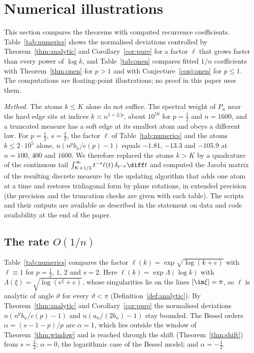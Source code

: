 
\section{Numerical illustrations}\label{sec:numerics}

This section compares the theorems with computed recurrence coefficients. Table~\ref{tab:numerics} shows the normalised
deviations controlled by Theorem~\ref{thm:analytic} and Corollary~\ref{cor:pure} for a factor $\ell$ that grows faster
than every power of $\log k$, and Table~\ref{tab:onen} compares fitted $1/n$ coefficients with Theorem~\ref{thm:onen}
for $p>1$ and with Conjecture~\ref{conj:onen} for $p\le1$. The computations are floating-point illustrations; no proof
in this paper uses them.

\emph{Method.} The atoms $k\le K$ alone do not suffice. The spectral weight of $P_n$ near the hard edge sits at indices
$k\asymp n^{1+2/p}$, about $10^{16}$ for $p=\frac12$ and $n=1600$, and a truncated measure has a soft edge at its
smallest atom and obeys a different law. For $p=\frac12$, $s=\frac32$, the factor $\ell$ of Table~\ref{tab:numerics} and
the atoms $k\le2\cdot10^5$ alone, $n(n^pb_n/c(p)-1)$ equals $-1.81$, $-13.3$ and $-105.9$ at $n=100$, $400$ and $1600$.
We therefore replaced the atoms $k>K$ by a quadrature of the continuous tail $\int_{K+1/2}^{\infty}t^{-s}\ell(t)\,
\delta_{t^{-p}}\diff t$ and computed the Jacobi matrix of the resulting discrete measure by the updating algorithm that
adds one atom at a time and restores tridiagonal form by plane rotations, in extended precision (the precision and the
truncation checks are given with each table). The scripts and their outputs are available as described in the statement
on data and code availability at the end of the paper.

\subsection{\texorpdfstring{The rate $O(1/n)$}{The rate O(1/n)}}
Table~\ref{tab:numerics} compares the factor $\ell(k)=\exp\sqrt{\log(k+e)}$ with $\ell\equiv1$ for $p=\frac12$, $1$, $2$
and $s=2$. Here $\ell(k)=\exp\Lambda(\log k)$ with $\Lambda(\xi)=\sqrt{\log(e^\xi+e)}$, whose singularities lie on the
lines $|\im\xi|=\pi$, so $\ell$ is analytic of angle $\vartheta$ for every $\vartheta<\pi$
(Definition~\ref{def:analytic}). By Theorem~\ref{thm:analytic} and Corollary~\ref{cor:pure} the normalised deviations
$n(n^pb_n/c(p)-1)$ and $n(a_n/(2b_n)-1)$ stay bounded. The Bessel orders $\alpha=(s-1-p)/p$ are $\alpha=1$, which lies
outside the window of Theorem~\ref{thm:window} and is reached through the shift (Theorem~\ref{thm:shift}) from
$s=\frac32$; $\alpha=0$, the logarithmic case of the Bessel model; and $\alpha=-\frac12$.

